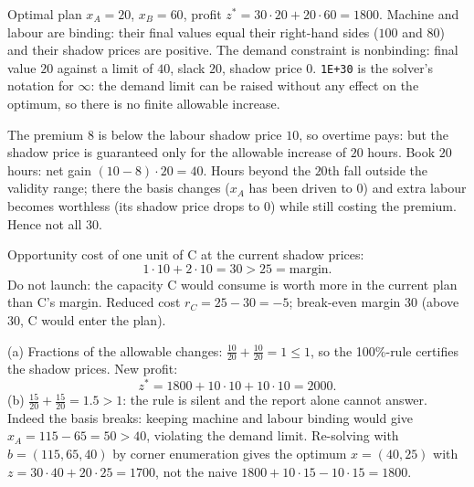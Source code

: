 \begin{solutions}
  \item Optimal plan $x_{A}=20$, $x_{B}=60$, profit
        $z^{*}=30\cdot20+20\cdot60=1800$. Machine and labour are binding:
        their final values equal their right-hand sides ($100$ and $80$)
        and their shadow prices are positive. The demand constraint is
        nonbinding: final value $20$ against a limit of $40$, slack
        $20$, shadow price $0$. \texttt{1E+30} is the solver's notation
        for $\infty$: the demand limit can be raised without any effect
        on the optimum, so there is no finite allowable increase.

  \item The premium $8$ is below the labour shadow price $10$, so
        overtime pays: but the shadow price is guaranteed only for the
        allowable increase of $20$ hours. Book $20$ hours: net gain
        $(10-8)\cdot 20=40$. Hours beyond the $20$th fall outside the
        validity range; there the basis changes ($x_{A}$ has been driven
        to $0$) and extra labour becomes worthless (its shadow price
        drops to $0$) while still costing the premium. Hence not all
        $30$.

  \item Opportunity cost of one unit of C at the current shadow prices:
        \[
          1\cdot 10+2\cdot 10=30>25=\text{margin}.
        \]
        Do not launch: the capacity C would consume is worth more in the
        current plan than C's margin. Reduced cost $r_{C}=25-30=-5$;
        break-even margin $30$ (above $30$, C would enter the plan).

  \item (a) Fractions of the allowable changes:
        $\tfrac{10}{20}+\tfrac{10}{20}=1\le 1$, so the 100\%-rule
        certifies the shadow prices. New profit:
        \[
          z^{*}=1800+10\cdot 10+10\cdot 10=2000 .
        \]
        (b) $\tfrac{15}{20}+\tfrac{15}{20}=1.5>1$: the rule is silent and
        the report alone cannot answer. Indeed the basis breaks: keeping
        machine and labour binding would give
        $x_{A}=115-65=50>40$, violating the demand limit. Re-solving
        with $b=(115,65,40)$ by corner enumeration gives the optimum
        $x=(40,25)$ with $z=30\cdot40+20\cdot25=1700$, not the naive
        $1800+10\cdot15-10\cdot15=1800$.


\end{solutions}
